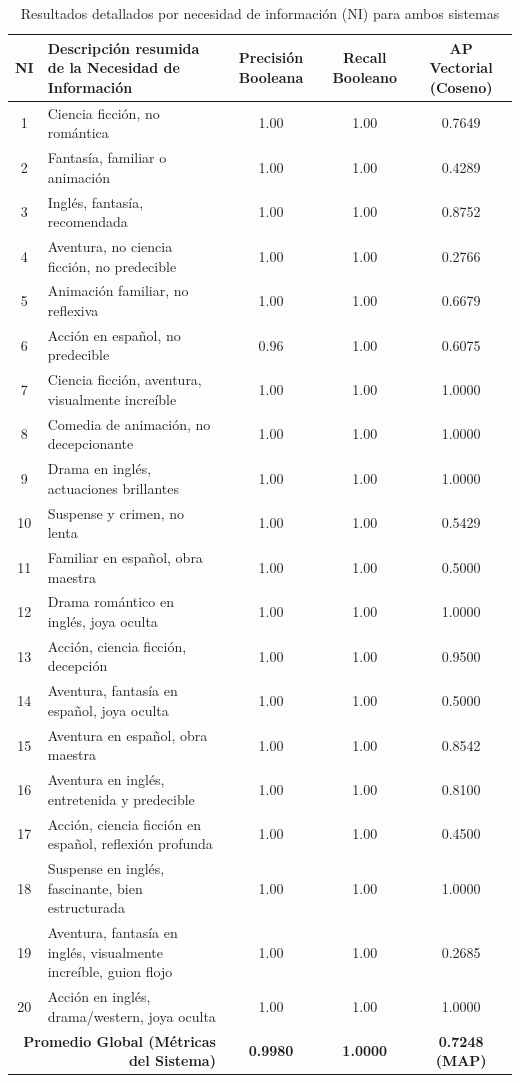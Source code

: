 \documentclass[conference,a4paper]{IEEEtran}
\begin{document}
\begin{table}[t]
  \caption{Resultados detallados por necesidad de información (NI) para ambos sistemas}
  \label{tab:resultados_detallados}
  \centering
  \begin{tabular}{clccc}
    \toprule
    \textbf{NI} & \textbf{Descripción resumida de la Necesidad de Información} & \textbf{Precisión Booleana} & \textbf{Recall Booleano} & \textbf{AP Vectorial (Coseno)} \\
    \midrule
    1  & Ciencia ficción, no romántica & 1.00 & 1.00 & 0.7649 \\
    2  & Fantasía, familiar o animación & 1.00 & 1.00 & 0.4289 \\
    3  & Inglés, fantasía, recomendada & 1.00 & 1.00 & 0.8752 \\
    4  & Aventura, no ciencia ficción, no predecible & 1.00 & 1.00 & 0.2766 \\
    5  & Animación familiar, no reflexiva & 1.00 & 1.00 & 0.6679 \\
    6  & Acción en español, no predecible & 0.96 & 1.00 & 0.6075 \\
    7  & Ciencia ficción, aventura, visualmente increíble & 1.00 & 1.00 & 1.0000 \\
    8  & Comedia de animación, no decepcionante & 1.00 & 1.00 & 1.0000 \\
    9  & Drama en inglés, actuaciones brillantes & 1.00 & 1.00 & 1.0000 \\
    10 & Suspense y crimen, no lenta & 1.00 & 1.00 & 0.5429 \\
    11 & Familiar en español, obra maestra & 1.00 & 1.00 & 0.5000 \\
    12 & Drama romántico en inglés, joya oculta & 1.00 & 1.00 & 1.0000 \\
    13 & Acción, ciencia ficción, decepción & 1.00 & 1.00 & 0.9500 \\
    14 & Aventura, fantasía en español, joya oculta & 1.00 & 1.00 & 0.5000 \\
    15 & Aventura en español, obra maestra & 1.00 & 1.00 & 0.8542 \\
    16 & Aventura en inglés, entretenida y predecible & 1.00 & 1.00 & 0.8100 \\
    17 & Acción, ciencia ficción en español, reflexión profunda & 1.00 & 1.00 & 0.4500 \\
    18 & Suspense en inglés, fascinante, bien estructurada & 1.00 & 1.00 & 1.0000 \\
    19 & Aventura, fantasía en inglés, visualmente increíble, guion flojo & 1.00 & 1.00 & 0.2685 \\
    20 & Acción en inglés, drama/western, joya oculta & 1.00 & 1.00 & 1.0000 \\
    \midrule
    \multicolumn{2}{r}{\textbf{Promedio Global (Métricas del Sistema)}} & \textbf{0.9980} & \textbf{1.0000} & \textbf{0.7248 (MAP)} \\
    \bottomrule
  \end{tabular}
\end{table}
\end{document}

